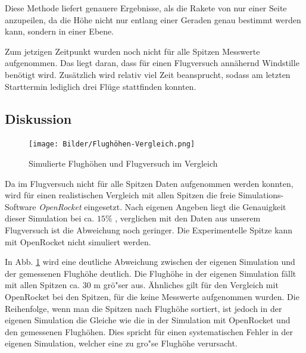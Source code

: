 \documentclass[10pt,a4paper]{article}
\begin{document}
\noindent
Diese Methode liefert genauere Ergebnisse, als die Rakete von nur einer Seite anzupeilen, da die Höhe nicht nur entlang einer Geraden genau bestimmt werden kann, sondern in einer Ebene. 

Zum jetzigen Zeitpunkt wurden noch nicht für alle Spitzen Messwerte aufgenommen. Das liegt daran, dass für einen Flugversuch annähernd Windstille benötigt wird. Zusätzlich wird relativ viel Zeit beansprucht, sodass am letzten Starttermin lediglich drei Flüge stattfinden konnten.


\subsection{Diskussion}

\begin{figure}[h]
	\centering
	\texttt{[image: Bilder/Flughöhen-Vergleich.png]}
	\caption{Simulierte Flughöhen und Flugversuch im Vergleich}
	\label{fig-Simulationsvergleich}
\end{figure}

\noindent
Da im Flugversuch nicht für alle Spitzen Daten aufgenommen werden konnten, wird für einen realistischen Vergleich mit allen Spitzen die freie Simulations-Software \emph{OpenRocket} eingesetzt. Nach eigenen Angeben liegt die Genauigkeit dieser Simulation bei ca. $15 \%$ \cite{sn}, verglichen mit den Daten aus unserem Flugversuch ist die Abweichung noch geringer. Die Experimentelle Spitze kann mit OpenRocket nicht simuliert werden.

In Abb. \ref{fig-Simulationsvergleich} wird eine deutliche Abweichung zwischen der eigenen Simulation und der gemessenen Flughöhe deutlich. Die Flughöhe in der eigenen Simulation fällt mit allen Spitzen ca. $30 \text{ m}$ grö"ser aus. Ähnliches gilt für den Vergleich mit OpenRocket bei den Spitzen, für die keine Messwerte aufgenommen wurden. Die Reihenfolge, wenn man die Spitzen nach Flughöhe sortiert, ist jedoch in der eigenen Simulation die Gleiche wie die in der Simulation mit OpenRocket und den gemessenen Flughöhen. Dies spricht für einen systematischen Fehler in der eigenen Simulation, welcher eine zu gro"se Flughöhe verursacht.
\end{document}
